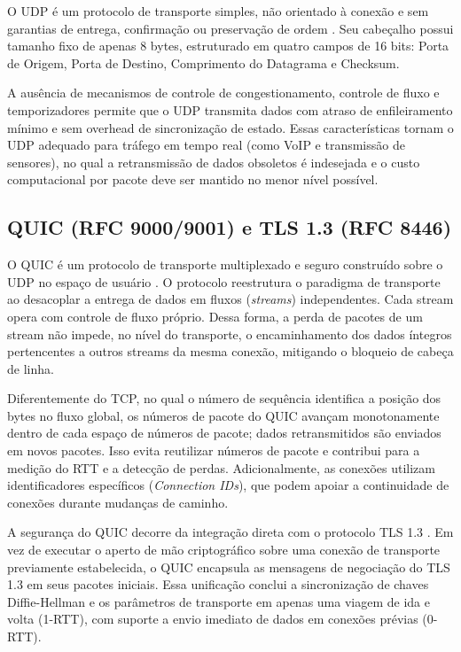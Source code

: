 \documentclass[12pt]{article}
\begin{document}
O UDP é um protocolo de transporte simples, não orientado à conexão e sem garantias de entrega, confirmação ou preservação de ordem \cite{rfc768}. Seu cabeçalho possui tamanho fixo de apenas 8 bytes, estruturado em quatro campos de 16 bits: Porta de Origem, Porta de Destino, Comprimento do Datagrama e Checksum.

A ausência de mecanismos de controle de congestionamento, controle de fluxo e temporizadores permite que o UDP transmita dados com atraso de enfileiramento mínimo e sem overhead de sincronização de estado. Essas características tornam o UDP adequado para tráfego em tempo real (como VoIP e transmissão de sensores), no qual a retransmissão de dados obsoletos é indesejada e o custo computacional por pacote deve ser mantido no menor nível possível.

\subsection{QUIC (RFC 9000/9001) e TLS 1.3 (RFC 8446)}

O QUIC é um protocolo de transporte multiplexado e seguro construído sobre o UDP no espaço de usuário \cite{rfc9000}. O protocolo reestrutura o paradigma de transporte ao desacoplar a entrega de dados em fluxos (\emph{streams}) independentes. Cada stream opera com controle de fluxo próprio. Dessa forma, a perda de pacotes de um stream não impede, no nível do transporte, o encaminhamento dos dados íntegros pertencentes a outros streams da mesma conexão, mitigando o bloqueio de cabeça de linha.

Diferentemente do TCP, no qual o número de sequência identifica a posição dos bytes no fluxo global, os números de pacote do QUIC avançam monotonamente dentro de cada espaço de números de pacote; dados retransmitidos são enviados em novos pacotes. Isso evita reutilizar números de pacote e contribui para a medição do RTT e a detecção de perdas. Adicionalmente, as conexões utilizam identificadores específicos (\emph{Connection IDs}), que podem apoiar a continuidade de conexões durante mudanças de caminho.

A segurança do QUIC decorre da integração direta com o protocolo TLS 1.3 \cite{rfc9001,rfc8446}. Em vez de executar o aperto de mão criptográfico sobre uma conexão de transporte previamente estabelecida, o QUIC encapsula as mensagens de negociação do TLS 1.3 em seus pacotes iniciais. Essa unificação conclui a sincronização de chaves Diffie-Hellman e os parâmetros de transporte em apenas uma viagem de ida e volta (1-RTT), com suporte a envio imediato de dados em conexões prévias (0-RTT).
\end{document}
